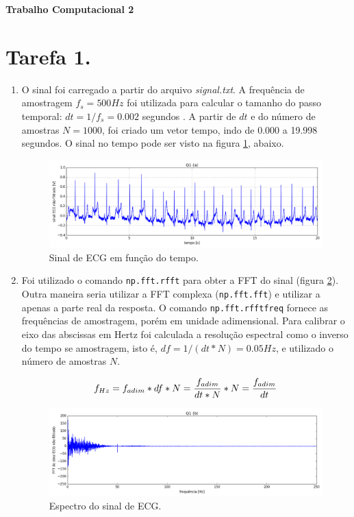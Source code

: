 \documentclass[12pt,letterpaper]{article}
\newcommand\hwnumber{2}
\begin{document}
\centerline{\textbf{\Large Trabalho Computacional \hwnumber}}

\centerline{}

\section*{Tarefa 1.}
\begin{enumerate}[label=(\alph*)]  %
    \item O sinal foi carregado a partir do arquivo \emph{signal.txt}. A frequência de amostragem ${f_s = 500 Hz}$ foi utilizada para calcular o tamanho do passo temporal: ${dt = 1/f_s = 0.002}$ segundos . A partir de ${dt}$ e do número de amostras ${N = 1000}$, foi criado um vetor tempo, indo de 0.000 a 19.998 segundos. O sinal no tempo pode ser visto na figura \ref{fig:1}, abaixo.
    
        \begin{figure}[H]
            \centering
            \includegraphics[width=15cm]{TC1/images/Q1_a_sinal_nfilt.png}
            \caption{Sinal de ECG em função do tempo.}
            \label{fig:1}
        \end{figure}

    \item
    Foi utilizado o comando \lstinline{np.fft.rfft} para obter a FFT do sinal (figura \ref{fig:2}). Outra maneira seria utilizar a FFT complexa (\lstinline{np.fft.fft}) e utilizar a apenas a parte real da resposta. O comando \lstinline{np.fft.rfftfreq} fornece as frequências de amostragem, porém em unidade adimensional. Para calibrar o eixo das abscissas em Hertz foi calculada a resolução espectral como o inverso do tempo se amostragem, isto é, ${df = {1/(dt*N)} = 0.05 Hz}$, e utilizado o número de amostras $N$.
    
    $${f_{Hz} = f_{adim}*df*N = {f_{adim} \over {dt*N}} *N = {f_{adim} \over dt}}$$
    
        \begin{figure}[H]
            \centering
            \includegraphics[width=15cm]{TC1/images/Q1_b_espectro_nfilt.png}
            \caption{Espectro do sinal de ECG.}
            \label{fig:2}
        \end{figure}
        

\end{enumerate}
\end{document}
